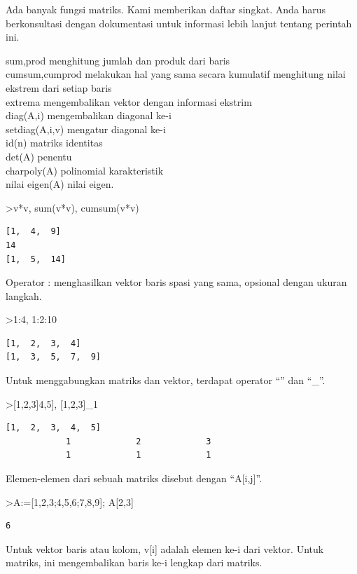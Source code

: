 \documentclass[
]{book}
\begin{document}
Ada banyak fungsi matriks. Kami memberikan daftar singkat. Anda harus berkonsultasi dengan dokumentasi untuk informasi lebih lanjut tentang perintah ini.

sum,prod menghitung jumlah dan produk dari baris\\
cumsum,cumprod melakukan hal yang sama secara kumulatif menghitung nilai ekstrem dari setiap baris\\
extrema mengembalikan vektor dengan informasi ekstrim\\
diag(A,i) mengembalikan diagonal ke-i\\
setdiag(A,i,v) mengatur diagonal ke-i\\
id(n) matriks identitas\\
det(A) penentu\\
charpoly(A) polinomial karakteristik\\
nilai eigen(A) nilai eigen.

\textgreater v*v, sum(v*v), cumsum(v*v)

\begin{verbatim}
[1,  4,  9]
14
[1,  5,  14]
\end{verbatim}

Operator : menghasilkan vektor baris spasi yang sama, opsional dengan ukuran langkah.

\textgreater1:4, 1:2:10

\begin{verbatim}
[1,  2,  3,  4]
[1,  3,  5,  7,  9]
\end{verbatim}

Untuk menggabungkan matriks dan vektor, terdapat operator ``\textbar{}'' dan ``\_''.

\textgreater{[}1,2,3{]}\textbar{[}4,5{]}, {[}1,2,3{]}\_1

\begin{verbatim}
[1,  2,  3,  4,  5]
            1             2             3 
            1             1             1 
\end{verbatim}

Elemen-elemen dari sebuah matriks disebut dengan ``A{[}i,j{]}''.

\textgreater A:={[}1,2,3;4,5,6;7,8,9{]}; A{[}2,3{]}

\begin{verbatim}
6
\end{verbatim}

Untuk vektor baris atau kolom, v{[}i{]} adalah elemen ke-i dari vektor. Untuk matriks, ini mengembalikan baris ke-i lengkap dari matriks.
\end{document}
